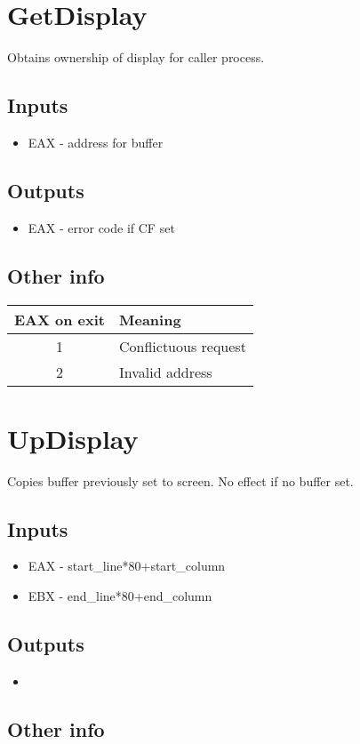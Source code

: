\documentclass{report}
\newcommand{\syscall}[5]{
\section{#1}
#2

\subsection*{Inputs}
\begin{itemize}
#3
\end{itemize}


\subsection*{Outputs}
\begin{itemize}
#4
\end{itemize}


\subsection*{Other info}
#5
}
\begin{document}
\syscall{GetDisplay}{
Obtains ownership of display for caller process.
}{
\item EAX - address for buffer
}{
\item EAX - error code if CF set
}{
\begin{tabular}{|c|l|}
\hline
EAX on exit & Meaning\\
\hline
1	& Conflictuous request\\
\hline
2	& Invalid address\\
\hline
\end{tabular}
}

\syscall{UpDisplay}{
Copies buffer previously set to screen. No effect if no buffer set.
}{
\item EAX - start\_line*80+start\_column
\item EBX - end\_line*80+end\_column
}{\item}{}
\end{document}
